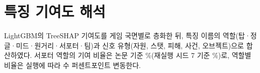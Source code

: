 
\section{특징 기여도 해석}
\label{sec:results-shap}

LightGBM의 TreeSHAP 기여도를 게임 국면별로 층화한 뒤, 특징 이름의 역할(탑·정글·미드·원거리·서포터·팀)과 신호 유형(자원, 스탯, 피해, 사건, 오브젝트)으로 합산하였다. 서포터 역할의 기여 비율은 논문 기준 \shapSupportPaper{}\%(재실행 시드 7 기준 \shapSupportRerun{}\%)로, 역할별 비율은 실행에 따라 수 퍼센트포인트 변동한다. 


